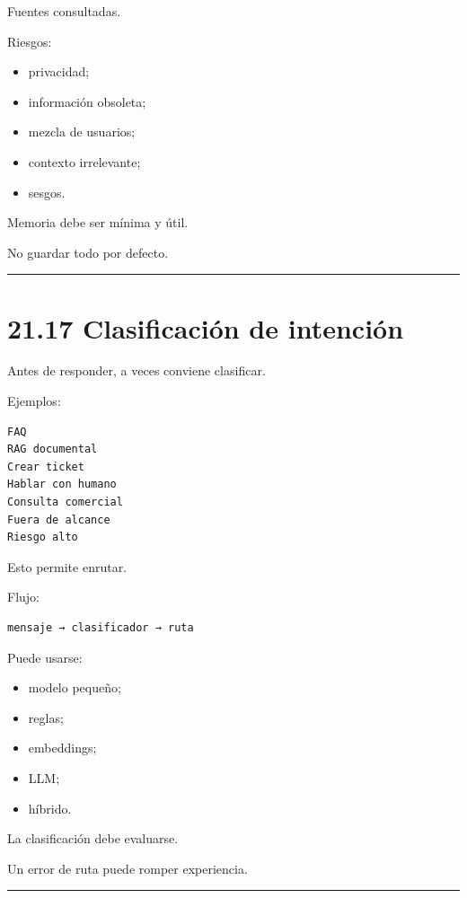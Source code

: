Fuentes consultadas.

Riesgos:

\begin{itemize}
\tightlist
\item
  privacidad;
\item
  información obsoleta;
\item
  mezcla de usuarios;
\item
  contexto irrelevante;
\item
  sesgos.
\end{itemize}

Memoria debe ser mínima y útil.

No guardar todo por defecto.

\begin{center}\rule{0.5\linewidth}{0.5pt}\end{center}

\section{21.17 Clasificación de
intención}\label{clasificaciuxf3n-de-intenciuxf3n}

Antes de responder, a veces conviene clasificar.

Ejemplos:

\begin{lstlisting}
FAQ
RAG documental
Crear ticket
Hablar con humano
Consulta comercial
Fuera de alcance
Riesgo alto
\end{lstlisting}

Esto permite enrutar.

Flujo:

\begin{lstlisting}
mensaje → clasificador → ruta
\end{lstlisting}

Puede usarse:

\begin{itemize}
\tightlist
\item
  modelo pequeño;
\item
  reglas;
\item
  embeddings;
\item
  LLM;
\item
  híbrido.
\end{itemize}

La clasificación debe evaluarse.

Un error de ruta puede romper experiencia.

\begin{center}\rule{0.5\linewidth}{0.5pt}\end{center}


